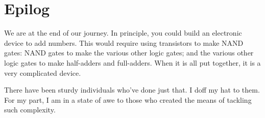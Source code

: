 \section{Epilog}

We are at the end of our journey.  In principle, you could build an electronic device to add numbers.  This would require using transistors to make NAND gates: NAND gates to make the various other logic gates; and the various other logic gates to make half-adders and full-adders.  When it is all put together, it is a very complicated device. 

There have been sturdy individuals who've done just that.  I doff my hat to them.  For my part, I am in a state of awe to those who created the means of tackling such complexity.